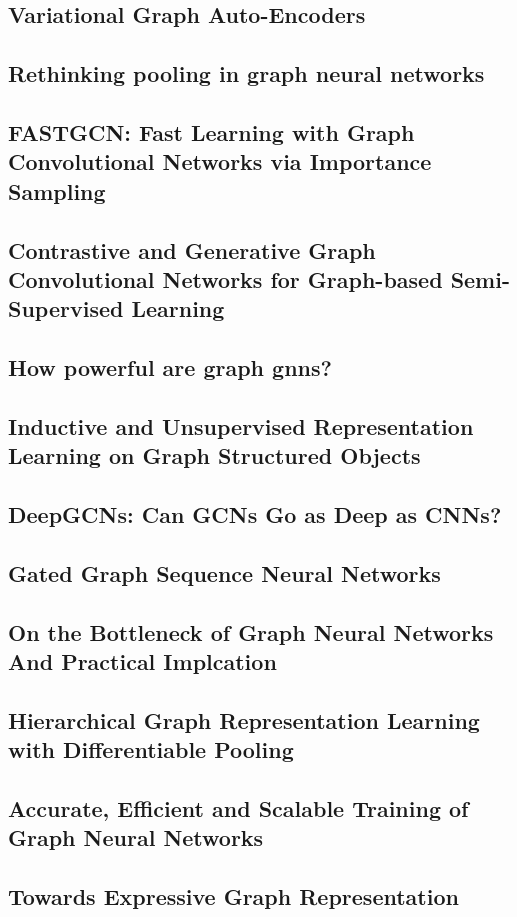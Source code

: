 \subsection{Variational Graph Auto-Encoders}


\subsection{Rethinking pooling in graph neural networks}


\subsection{FASTGCN: Fast Learning with Graph Convolutional Networks via Importance Sampling}


\subsection{Contrastive and Generative Graph Convolutional Networks for Graph-based Semi-Supervised Learning}


\subsection{How powerful are graph gnns?}


\subsection{Inductive and Unsupervised Representation Learning on Graph Structured Objects}


\subsection{DeepGCNs: Can GCNs Go as Deep as CNNs?}


\subsection{Gated Graph Sequence Neural Networks}


\subsection{On the Bottleneck of Graph Neural Networks And Practical Implcation}


\subsection{Hierarchical Graph Representation Learning with Differentiable Pooling}


\subsection{Accurate, Efficient and Scalable Training of Graph Neural Networks}


\subsection{Towards Expressive Graph Representation}
